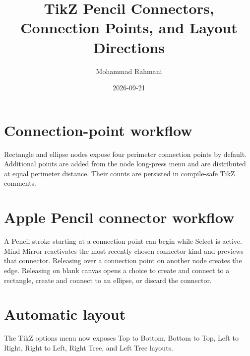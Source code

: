 \documentclass[a4paper]{article}
\title{TikZ Pencil Connectors, Connection Points, and Layout Directions}
\date{2026-09-21}
\author{Mohammad Rahmani}
\begin{document}
   \maketitle

   \begin{preview}
      \section{Connection-point workflow}
      Rectangle and ellipse nodes expose four perimeter connection points by
      default.  Additional points are added from the node long-press menu and
      are distributed at equal perimeter distance.  Their counts are persisted
      in compile-safe TikZ comments.

      \section{Apple Pencil connector workflow}
      A Pencil stroke starting at a connection point can begin while Select is
      active.  Mind Mirror reactivates the most recently chosen connector kind
      and previews that connector.  Releasing over a connection point on
      another node creates the edge.  Releasing on blank canvas opens a choice
      to create and connect to a rectangle, create and connect to an ellipse,
      or discard the connector.

      \section{Automatic layout}
      The TikZ options menu now exposes Top to Bottom, Bottom to Top, Left to
      Right, Right to Left, Right Tree, and Left Tree layouts.
   \end{preview}

   
   
\end{document}
